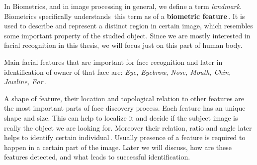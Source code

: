 In Biometrics, and in image processing in general, we define a term \textit{landmark}. Biometrics specifically understands\,\cite{handbook_bio} this term as of a \textbf{biometric feature}\,\cite{nixon2012feature}. It is used to describe and represent a distinct region in certain image, which resembles some important property of the studied object. Since we are mostly interested in facial recognition in this thesis, we will focus just on this part of human body.

Main facial features that are important for face recognition and later in identification of owner of that face are: \textit{Eye, Eyebrow, Nose, Mouth, Chin, Jawline, Ear}\,\cite{biometrie_drahan}.

A shape of feature, their location and topological relation to other features are the most important parts of face discovery process. Each feature has an unique shape and size. This can help to localize it and decide if the subject image is really the object we are looking for.  Moreover their relation, ratio and angle later helps to identify certain individual\,\cite{video}. Usually presence of a feature is required to happen in a certain part of the image. Later we will discuss, how are these features detected, and what leads to successful identification.
